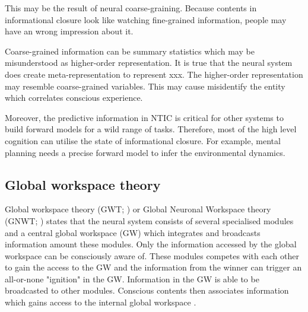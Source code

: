 \documentclass[utf8]{article}
\begin{document}
		    
		    This may be the result of neural coarse-graining. Because contents in informational closure look like watching fine-grained information, people may have an wrong impression about it. 
		    
		    
		    Coarse-grained information can be summary statistics which may be misunderstood as higher-order representation. It is true that the neural system does create  meta-representation to represent xxx. The higher-order representation may resemble coarse-grained variables. This may cause misidentify the entity which correlates conscious experience.  
		    
		    Moreover, the predictive information in NTIC is critical for other systems to build forward models for a wild range of tasks. Therefore, most of the high level cognition can utilise the state of informational closure. For example, mental planning needs a precise forward model to infer the environmental dynamics.

				
        
		\subsection{Global workspace theory}
		Global workspace theory (GWT; \cite{baars1988cognitive, baars1997theatre, baars2002conscious}) or Global Neuronal Workspace theory (GNWT; \cite{dehaene1998neuronal, dehaene2001towards, dehaene2011experimental}) states that the neural system consists of several specialised modules and a central global workspace (GW) which integrates and broadcasts information amount these modules. Only the information accessed by the global workspace can be consciously aware of. These modules competes with each other to gain the access to the GW and the information from the winner can trigger an all-or-none "ignition" in the GW. Information in the GW is able to be broadcasted to other modules. Conscious contents then associates information which gains access to the internal global workspace \cite{Dehaene2017}.
		
\end{document}
